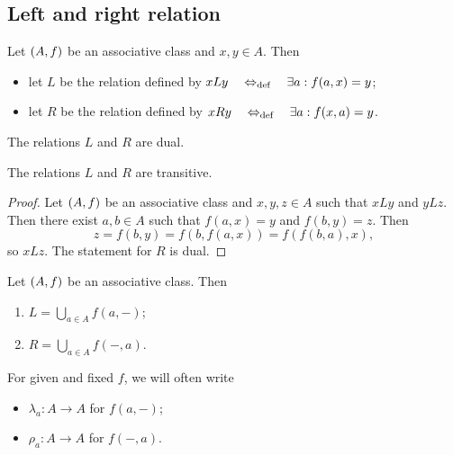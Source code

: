 \subsection{Left and right relation}
\begin{definition}
Let $\left( A, f \right)$ be an associative class and $x, y\in A$. Then
\begin{itemize}
\item let $L$ be the relation defined by $xLy \quad\Leftrightarrow_{\text{def}}\quad \exists a: f(a, x) = y$;
\item let $R$ be the relation defined by $xRy \quad\Leftrightarrow_{\text{def}}\quad \exists a: f(x, a) = y$.
\end{itemize}
\end{definition}

The relations $L$ and $R$ are dual.

\begin{lemma}
The relations $L$ and $R$ are transitive.
\end{lemma}
\begin{proof}
Let $\left( A, f \right)$ be an associative class and $x, y, z\in A$ such that $xLy$ and $yLz$. Then there exist $a,b\in A$ such that $f(a,x) = y$ and $f(b,y) = z$. Then
\[ z = f(b,y) = f(b,f(a,x)) = f(f(b,a), x), \]
so $xLz$. The statement for $R$ is dual.
\end{proof}

\begin{lemma}
Let $\left( A, f \right)$ be an associative class. Then
\begin{enumerate}
\item $L = \bigcup_{a\in A}f(a, -)$;
\item $R = \bigcup_{a\in A}f(-, a)$.
\end{enumerate}
\end{lemma}

For given and fixed $f$, we will often write
\begin{itemize}
\item $\lambda_a: A\to A$ for $f(a, -)$;
\item $\rho_a: A\to A$ for $f(-, a)$.
\end{itemize}

